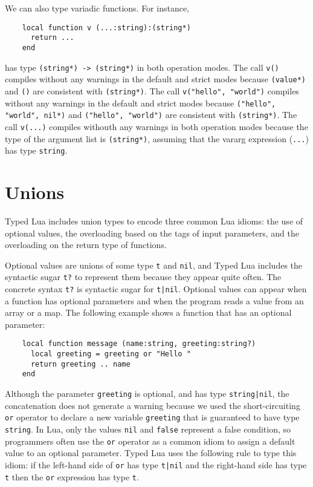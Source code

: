 We can also type variadic functions.
For instance,
\begin{verbatim}
    local function v (...:string):(string*)
      return ...
    end
\end{verbatim}
has type \texttt{(string*) -> (string*)} in both operation modes.
The call \texttt{v()} compiles without any warnings in the default and
strict modes because \texttt{(value*)} and \texttt{()} are consistent
with \texttt{(string*)}.
The call \texttt{v("hello", "world")} compiles without any warnings
in the default and strict modes because \texttt{("hello", "world", nil*)}
and \texttt{("hello", "world")} are consistent with \texttt{(string*)}.
The call \texttt{v(...)} compiles withouth any warnings in both
operation modes because the type of the argument list is \texttt{(string*)},
assuming that the vararg expression (\texttt{...}) has type \texttt{string}.

\section{Unions}
\label{sec:unions}

Typed Lua includes union types to encode three common Lua idioms:
the use of optional values, the overloading based on the tags of
input parameters, and the overloading on the return type of functions.

Optional values are unions of some type \texttt{t} and \texttt{nil},
and Typed Lua includes the syntactic sugar \texttt{t?} to represent
them because they appear quite often.
The concrete syntax \texttt{t?} is syntactic sugar for \texttt{t|nil}.
Optional values can appear when a function has optional parameters
and when the program reads a value from an array or a map.
The following example shows a function that has an optional parameter:
\begin{verbatim}
    local function message (name:string, greeting:string?)
      local greeting = greeting or "Hello "
      return greeting .. name
    end
\end{verbatim}

Although the parameter \texttt{greeting} is optional, and has type
\texttt{string|nil}, the concatenation does not generate a warning
because we used the short-circuiting \texttt{or} operator to declare a
new variable \texttt{greeting} that is guaranteed to have type \texttt{string}. 
In Lua, only the values \texttt{nil} and \texttt{false} represent a
false condition, so programmers often use the \texttt{or} operator as a
common idiom to assign a default value to an optional parameter. 
Typed Lua uses the following rule to type this idiom: 
if the left-hand side of \texttt{or} has type \texttt{t|nil} and
the right-hand side has type \texttt{t} then the \texttt{or} expression has
type \texttt{t}.

